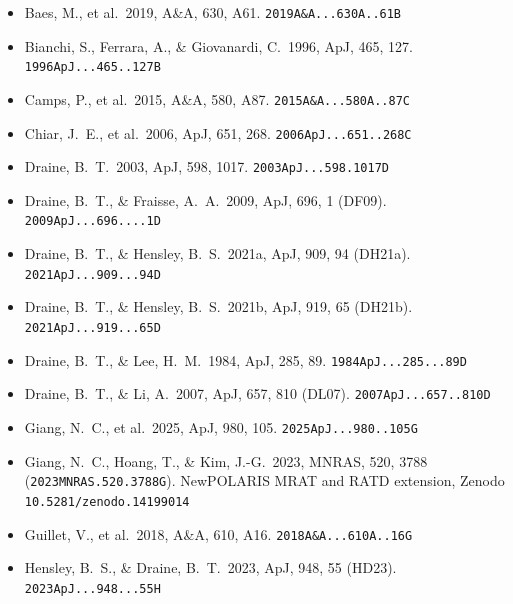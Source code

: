 \documentclass{my_memo}
\newcommand{\code}[1]{\texttt{#1}}
\begin{document}
\begin{itemize}\setlength{\itemsep}{2pt}

\item Baes, M., et al.\ 2019, A\&A, 630, A61.
      \code{2019A\&A...630A..61B}

\item Bianchi, S., Ferrara, A., \& Giovanardi, C.\ 1996, ApJ, 465, 127.
      \code{1996ApJ...465..127B}

\item Camps, P., et al.\ 2015, A\&A, 580, A87.
      \code{2015A\&A...580A..87C}

\item Chiar, J.~E., et al.\ 2006, ApJ, 651, 268.
      \code{2006ApJ...651..268C}

\item Draine, B.~T.\ 2003, ApJ, 598, 1017.
      \code{2003ApJ...598.1017D}

\item Draine, B.~T., \& Fraisse, A.~A.\ 2009, ApJ, 696, 1 (DF09).
      \code{2009ApJ...696....1D}

\item Draine, B.~T., \& Hensley, B.~S.\ 2021a, ApJ, 909, 94 (DH21a).
      \code{2021ApJ...909...94D}

\item Draine, B.~T., \& Hensley, B.~S.\ 2021b, ApJ, 919, 65 (DH21b).
      \code{2021ApJ...919...65D}

\item Draine, B.~T., \& Lee, H.~M.\ 1984, ApJ, 285, 89.
      \code{1984ApJ...285...89D}

\item Draine, B.~T., \& Li, A.\ 2007, ApJ, 657, 810 (DL07).
      \code{2007ApJ...657..810D}

\item Giang, N.~C., et al.\ 2025, ApJ, 980, 105.
      \code{2025ApJ...980..105G}

\item Giang, N.~C., Hoang, T., \& Kim, J.-G.\ 2023, MNRAS, 520, 3788
      (\code{2023MNRAS.520.3788G}). NewPOLARIS MRAT and RATD extension,
      Zenodo \code{10.5281/zenodo.14199014}

\item Guillet, V., et al.\ 2018, A\&A, 610, A16.
      \code{2018A\&A...610A..16G}

\item Hensley, B.~S., \& Draine, B.~T.\ 2023, ApJ, 948, 55 (HD23).
      \code{2023ApJ...948...55H}


\end{itemize}
\end{document}
